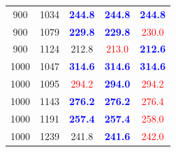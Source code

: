 {\begin{tabular}{|cc|c|cc|}
900 & 1034 & \textbf{\textcolor{blue}{244.8}} & \textbf{\textcolor{blue}{244.8}} & \textbf{\textcolor{blue}{244.8}}\\
900 & 1079 & \textbf{\textcolor{blue}{229.8}} & \textbf{\textcolor{blue}{229.8}} & \textcolor{red}{230.0}\\
900 & 1124 & 212.8 & \textcolor{red}{213.0} & \textbf{\textcolor{blue}{212.6}}\\
1000 & 1047 & \textbf{\textcolor{blue}{314.6}} & \textbf{\textcolor{blue}{314.6}} & \textbf{\textcolor{blue}{314.6}}\\
1000 & 1095 & \textcolor{red}{294.2} & \textbf{\textcolor{blue}{294.0}} & \textcolor{red}{294.2}\\
1000 & 1143 & \textbf{\textcolor{blue}{276.2}} & \textbf{\textcolor{blue}{276.2}} & \textcolor{red}{276.4}\\
1000 & 1191 & \textbf{\textcolor{blue}{257.4}} & \textbf{\textcolor{blue}{257.4}} & \textcolor{red}{258.0}\\
1000 & 1239 & 241.8 & \textbf{\textcolor{blue}{241.6}} & \textcolor{red}{242.0}\\
\hline
\end{tabular}}